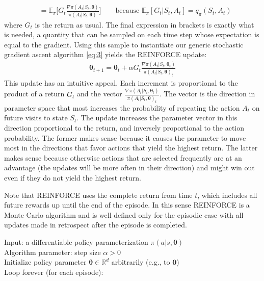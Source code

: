 {\begin{align*}
    &=\mathbb{E}_\pi\Big[G_t\frac{\nabla\pi(A_t|S_t, \bm{\theta})}{\pi(A_t|S_t, \bm{\theta})}\Big] \qquad\text{because $\mathbb{E}_\pi[G_t|S_t,A_t]=q_\pi(S_t, A_t)$}
\end{align*}
where $G_t$ is the return as usual. The final expression in brackets is exactly what is needed, a quantity that can be sampled on each time step whose expectation is equal to the gradient. Using this sample to instantiate our generic stochastic gradient ascent algorithm \ref{eq:3} yields the REINFORCE update:
\begin{align}\label{eq:4}
\bm{\theta}_{t+1} = \bm{\theta}_t + \alpha G_t\frac{\nabla\pi(A_t|S_t, \bm{\theta}_t)}{\pi(A_t|S_t, \bm{\theta})_t}
\end{align}
This update has an intuitive appeal. Each increment is proportional to the product of a return $G_t$ and the vector $\frac{\nabla\pi(A_t|S_t, \bm{\theta}_t)}{\pi(A_t|S_t, \bm{\theta})_t}$. The vector is the direction in parameter space that most increases the probability of repeating the action $A_t$ on future visits to state $S_t$.
The update increases the parameter vector in this direction proportional to the return, and inversely proportional to the action probability. The former makes sense because it causes the parameter to move most in the directions that favor actions that yield the highest return. The latter makes sense because otherwise actions that are selected frequently are at an advantage (the updates will be more often in their direction) and might win out even if they do not yield the highest return.

Note that REINFORCE uses the complete return from time $t$, which includes all future rewards up until the end of the episode. In this sense REINFORCE is a Monte Carlo algorithm and is well defined only for the episodic case with all updates made in retrospect after the episode is completed.

\begin{tcolorbox}[colback=black!7!white,colframe=black!75!white,title=\textbf{REINFORCE: Monte-Carlo Policy-Gradient Control (episodic) for $\pi_*$}]
Input: a differentiable policy parameterization $\pi(a|s,\bm{\theta})$\\
Algorithm parameter: step size $\alpha > 0$\\
Initialize policy parameter $\bm{\theta}\in\mathbb{R}^d$ arbitrarily (e.g., to $\bm{0}$)\\


Loop forever (for each episode):


\end{tcolorbox}}
